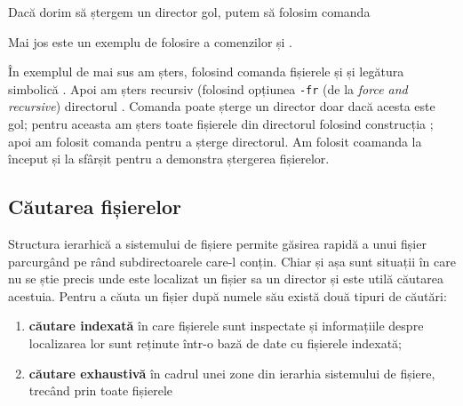 \begin{note}[Observație]
Dacă dorim să ștergem un director gol, putem să folosim comanda
\end{note}

Mai jos este un exemplu de folosire a comenzilor  și .


În exemplul de mai sus am șters, folosind comanda  fișierele  și  și legătura simbolică . Apoi am șters recursiv (folosind opțiunea \texttt{-fr} (de la \textit{force and recursive}) directorul . Comanda  poate șterge un director doar dacă acesta este gol; pentru aceasta am șters toate fișierele din directorul  folosind construcția ; apoi am folosit comanda  pentru a șterge directorul. Am folosit coamanda  la început și la sfârșit pentru a demonstra ștergerea fișierelor.

\subsection{Căutarea fișierelor}
\label{sec:file-system-file-search}

Structura ierarhică a sistemului de fișiere permite găsirea rapidă a unui fișier parcurgând pe rând subdirectoarele care-l conțin. Chiar și așa sunt situații în care nu se știe precis unde este localizat un fișier sa un director și este utilă căutarea acestuia. Pentru a căuta un fișier după numele său există două tipuri de căutări:
\begin{enumerate}
  \item \textbf{căutare indexată} în care fișierele sunt inspectate și informațiile despre localizarea lor sunt reținute într-o bază de date cu fișierele indexată;
  \item \textbf{căutare exhaustivă} în cadrul unei zone din ierarhia sistemului de fișiere, trecând prin toate fișierele
\end{enumerate}

